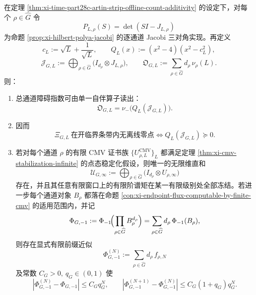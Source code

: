 \begin{theorem}\label{thm:xi-time-part28c-artin-jacobi-cmv-directsum-obstruction}
在定理 \ref{thm:xi-time-part28c-artin-strip-offline-count-additivity} 的设定下，对每个 \(\rho\in\widehat G\) 令
\[
P_{L,\rho}(S)=\det(SI-J_{L,\rho})
\]
为命题 \ref{prop:xi-hilbert-polya-jacobi} 的逐通道 Jacobi 三对角实现。再定义
\[
c_L:=\sqrt L+\frac{1}{\sqrt L},
\qquad
Q_L(x):=(x^2-4)(x^2-c_L^2),
\]
\[
\mathcal J_{G,L}
:=
\bigoplus_{\rho\in\widehat G}
\bigl(I_{d_\rho}\otimes J_{L,\rho}\bigr),
\qquad
\mathfrak O_{G,L}:=\sum_{\rho\in\widehat G} d_\rho\,\nu_\rho(L).
\]
则：
\begin{enumerate}
  \item 总通道障碍指数可由单一自伴算子读出：
  \[
  \boxed{\;
  \mathfrak O_{G,L}
  =
  \nu_-\!\bigl(Q_L(\mathcal J_{G,L})\bigr).\;}
  \]
  \item 因而
  \[
  \boxed{\;
  \Xi_{G,L}\ \text{在开临界条带内无离线零点}
  \iff
  Q_L(\mathcal J_{G,L})\succeq 0.\;}
  \]
  \item 若对每个通道 \(\rho\) 的有限 CMV 证书族 \(\{U_{\rho,L}^{\mathrm{CMV}}\}_L\) 都满足定理 \ref{thm:xi-cmv-stabilization-infinite} 的点态稳定化假设，则唯一的无限维直和
  \[
  \mathcal U_{G,\infty}
  :=
  \bigoplus_{\rho\in\widehat G}
  \bigl(I_{d_\rho}\otimes U_{\rho,\infty}\bigr)
  \]
  存在，并且其任意有限窗口上的有限阶谱矩在某一有限级别处全部冻结。若进一步每个通道对象 \(B_\rho\) 都落在命题 \ref{con:xi-endpoint-flux-computable-by-finite-cmv} 的适用范围内，并记
  \[
  \Phi_{G,-1}
  :=
  \Phi_{-1}\!\Bigl(\prod_{\rho\in\widehat G} B_\rho^{d_\rho}\Bigr)
  =
  \sum_{\rho\in\widehat G} d_\rho\,\Phi_{-1}(B_\rho),
  \]
  则存在显式有限前缀近似
  \[
  \Phi_{G,-1}^{(N)}:=\sum_{\rho\in\widehat G} d_\rho\,f_{\rho,N}
  \]
  及常数 \(C_G>0,\ q_G\in(0,1)\) 使
  \[
  |\Phi_{G,-1}^{(N)}-\Phi_{G,-1}|\le C_G q_G^N,
  \qquad
  |\Phi_{G,-1}^{(N+1)}-\Phi_{G,-1}^{(N)}|
  \le C_G(1+q_G)q_G^N.
  \]
\end{enumerate}
\end{theorem}
